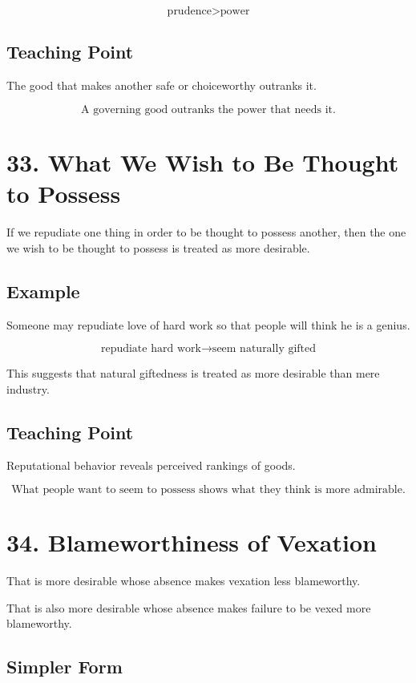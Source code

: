 \documentclass[12pt]{article}
\begin{document}
\[
\text{prudence} > \text{power}
\]

\subsection*{Teaching Point}

The good that makes another safe or choiceworthy outranks it.

\[
\boxed{
\text{A governing good outranks the power that needs it.}
}
\]

\section*{33. What We Wish to Be Thought to Possess}

If we repudiate one thing in order to be thought to possess another, then the
one we wish to be thought to possess is treated as more desirable.

\subsection*{Example}

Someone may repudiate love of hard work so that people will think he is a
genius.

\[
\text{repudiate hard work} \rightarrow \text{seem naturally gifted}
\]

This suggests that natural giftedness is treated as more desirable than mere
industry.

\subsection*{Teaching Point}

Reputational behavior reveals perceived rankings of goods.

\[
\boxed{
\text{What people want to seem to possess shows what they think is more admirable.}
}
\]

\section*{34. Blameworthiness of Vexation}

That is more desirable whose absence makes vexation less blameworthy.

That is also more desirable whose absence makes failure to be vexed more
blameworthy.

\subsection*{Simpler Form}
\end{document}
